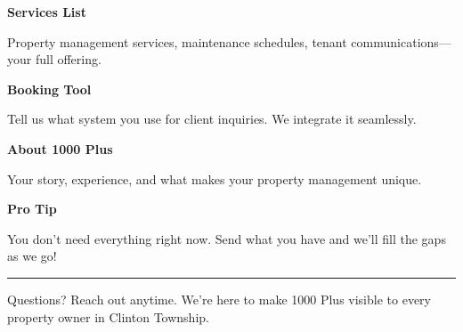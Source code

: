 \documentclass[11pt,letterpaper]{article}
\begin{document}
\hfill
\begin{minipage}[t]{0.48\textwidth}
\begin{tcolorbox}[colframe=accent-teal, boxrule=1pt, left=0.7em, right=0.7em, top=0.5em, bottom=0.5em, arc=4pt, boxsep=0pt]
{\bfseries\small\color{accent-teal}Services List}

\vspace{0.15em}

{\small Property management services, maintenance schedules, tenant communications—your full offering.}
\end{tcolorbox}

\vspace{0.1em}

\begin{tcolorbox}[colframe=accent-teal, boxrule=1pt, left=0.7em, right=0.7em, top=0.5em, bottom=0.5em, arc=4pt, boxsep=0pt]
{\bfseries\small\color{accent-teal}Booking Tool}

\vspace{0.15em}

{\small Tell us what system you use for client inquiries. We integrate it seamlessly.}
\end{tcolorbox}

\vspace{0.1em}

\begin{tcolorbox}[colframe=accent-teal, boxrule=1pt, left=0.7em, right=0.7em, top=0.5em, bottom=0.5em, arc=4pt, boxsep=0pt]
{\bfseries\small\color{accent-teal}About 1000 Plus}

\vspace{0.15em}

{\small Your story, experience, and what makes your property management unique.}
\end{tcolorbox}

\vspace{-0.2em}
\end{minipage}

\vspace{0.15em}

\begin{tcolorbox}[colback={accent-red!5}, colframe=accent-red!20, boxrule=0.5pt, left=0.7em, right=0.7em, top=0.4em, bottom=0.4em, arc=6pt, boxsep=0pt]

{\bfseries\small\color{accent-red}Pro Tip}

\vspace{0.1em}

{\small You don't need everything right now. Send what you have and we'll fill the gaps as we go!}

\end{tcolorbox}

\vspace{0.15em}

\noindent\hrule
\vspace{0.2em}

{\small\color{text-light}Questions? Reach out anytime. We're here to make 1000 Plus visible to every property owner in Clinton Township.}
\end{document}
